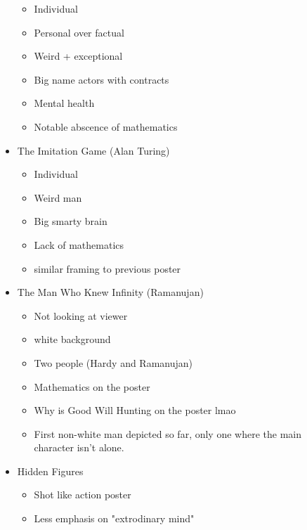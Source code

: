 \documentclass{report}
\begin{document}
\begin{description}
\begin{mdframed}
\begin{itemize}
\begin{itemize}
                        \item Individual
                        \item Personal over factual
                        \item Weird + exceptional
                        \item Big name actors with contracts
                        \item Mental health
                        \item Notable abscence of mathematics
                    \end{itemize}
                \item The Imitation Game (Alan Turing)
                    \begin{itemize}
                        \item Individual
                        \item Weird man
                        \item Big smarty brain
                        \item Lack of mathematics
                        \item similar framing to previous poster
                    \end{itemize}
                \item The Man Who Knew Infinity (Ramanujan)
                    \begin{itemize}
                        \item Not looking at viewer
                        \item white background
                        \item Two people (Hardy and Ramanujan)
                        \item Mathematics on the poster
                        \item Why is Good Will Hunting on the
                            poster lmao
                        \item First non-white man depicted so far,
                            only one where the main character
                            isn't alone.
                    \end{itemize}
                \item Hidden Figures
                    \begin{itemize}
                        \item Shot like action poster
                        \item Less emphasis on "extrodinary mind"

\end{itemize}
\end{itemize}
\end{mdframed}
\end{description}
\end{document}
